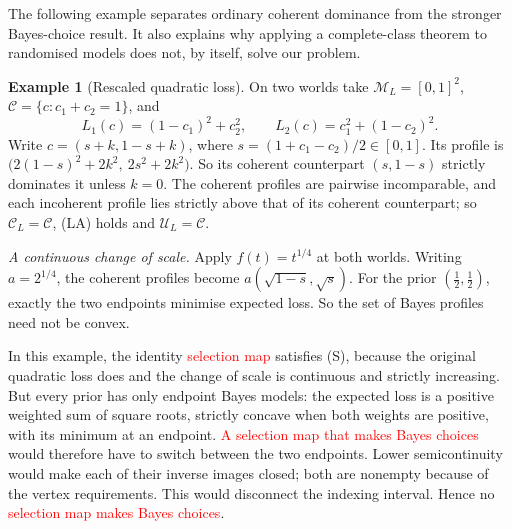 \documentclass[11pt]{article}
\theoremstyle{definition}
\newtheorem{example}[theorem]{Example}
\theoremstyle{remark}
\newcommand{\M}{\mathcal M}
\newcommand{\C}{\mathcal C}
\newcommand{\U}{\mathcal U}
\begin{document}
The following example separates ordinary coherent dominance from the stronger Bayes-choice result. It also explains why applying a complete-class theorem to randomised models does not, by itself, solve our problem.
\begin{example}[Rescaled quadratic loss]\label{ex:rescale}
On two worlds take $\M_L=[0,1]^2$, $\C=\{c:c_1+c_2=1\}$, and
\[
 L_1(c)=(1-c_1)^2+c_2^2,\qquad L_2(c)=c_1^2+(1-c_2)^2.
\]
Write $c=(s+k,1-s+k)$, where $s=(1+c_1-c_2)/2\in[0,1]$. Its profile is $\bigl(2(1-s)^2+2k^2,\ 2s^2+2k^2\bigr)$. So its coherent counterpart $(s,1-s)$ strictly dominates it unless $k=0$. The coherent profiles are pairwise incomparable, and each incoherent profile lies strictly above that of its coherent counterpart; so $\C_L=\C$, (LA) holds and $\U_L=\C$.

\emph{A continuous change of scale.} Apply $f(t)=t^{1/4}$ at both worlds. Writing $a=2^{1/4}$, the coherent profiles become $a(\sqrt{1-s},\sqrt s)$. For the prior $(\tfrac12,\tfrac12)$, exactly the two endpoints minimise expected loss. So the set of Bayes profiles need not be convex.

\end{example}

In this example, the identity \textcolor{red}{selection map} satisfies (S), because the original quadratic loss does and the change of scale is continuous and strictly increasing. But every prior has only endpoint Bayes models: the expected loss is a positive weighted sum of square roots, strictly concave when both weights are positive, with its minimum at an endpoint. \textcolor{red}{A selection map that makes Bayes choices} would therefore have to switch between the two endpoints. Lower semicontinuity would make each of their inverse images closed; both are nonempty because of the vertex requirements. This would disconnect the indexing interval. Hence no \textcolor{red}{selection map makes Bayes choices}.\label{rem:bayeschoice}
\end{document}
